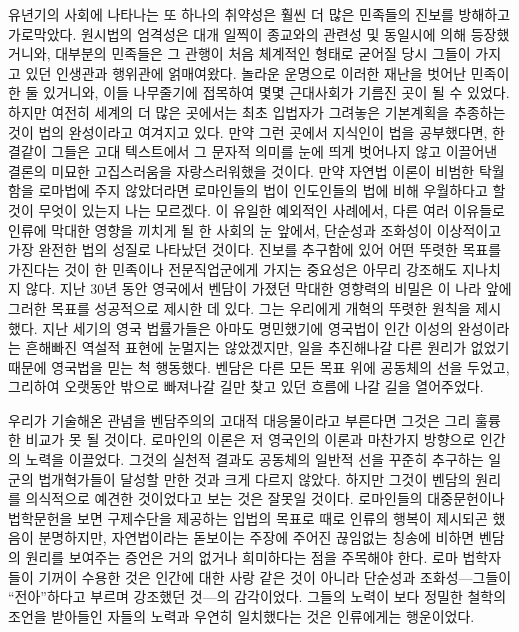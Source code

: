 유년기의 사회에 나타나는 또 하나의 취약성은 훨씬 더 많은 민족들의 진보를
방해하고 가로막았다.
원시법의 엄격성은 대개 일찍이 종교와의 관련성 및 동일시에 의해 등장했거니와,
대부분의 민족들은 그 관행이 처음 체계적인 형태로 굳어질 당시 그들이
가지고 있던 인생관과 행위관에 얽매여왔다.
놀라운 운명으로 이러한 재난을 벗어난 민족이 한 둘 있거니와,
이들 나무줄기에 접목하여 몇몇 근대사회가 기름진 곳이 될 수 있었다.
하지만 여전히 세계의 더 많은 곳에서는 최초 입법자가 그려놓은 기본계획을
추종하는 것이 법의 완성이라고 여겨지고 있다.
만약 그런 곳에서 지식인이 법을 공부했다면, 한결같이 그들은
고대 텍스트에서 그 문자적 의미를 눈에 띄게 벗어나지 않고 이끌어낸 결론의
미묘한 고집스러움을 자랑스러워했을 것이다.
만약 자연법 이론이 비범한 탁월함을 로마법에 주지 않았더라면
로마인들의 법이 인도인들의 법에 비해 우월하다고 할 것이
무엇이 있는지 나는 모르겠다.
이 유일한 예외적인 사례에서, 다른 여러 이유들로 인류에 막대한 영향을 끼치게 될
한 사회의 눈 앞에서, 단순성과 조화성이 이상적이고 가장 완전한 법의 성질로
나타났던 것이다.
진보를 추구함에 있어 어떤 뚜렷한 목표를 가진다는 것이
한 민족이나 전문직업군에게 가지는 중요성은 아무리 강조해도 지나치지 않다.
지난 30년 동안 영국에서 벤담이 가졌던 막대한 영향력의 비밀은
이 나라 앞에 그러한 목표를 성공적으로 제시한 데 있다.
그는 우리에게 개혁의 뚜렷한 원칙을 제시했다.
지난 세기의 영국 법률가들은 아마도 명민했기에
영국법이 인간 이성의 완성이라는 흔해빠진 역설적 표현에 눈멀지는 않았겠지만,
일을 추진해나갈 다른 원리가 없었기 때문에 영국법을 믿는 척 행동했다.
벤담은 다른 모든 목표 위에 공동체의 선을 두었고,
그리하여 오랫동안 밖으로 빠져나갈 길만 찾고 있던 흐름에 나갈 길을 열어주었다.

우리가 기술해온 관념을 벤담주의의 고대적 대응물이라고 부른다면
그것은 그리 훌륭한 비교가 못 될 것이다.
로마인의 이론은 저 영국인의 이론과 마찬가지 방향으로 인간의 노력을 이끌었다.
그것의 실천적 결과도 공동체의 일반적 선을 꾸준히 추구하는
일군의 법개혁가들이 달성할 만한 것과 크게 다르지 않았다.
하지만 그것이 벤담의 원리를
의식적으로 예견한 것이었다고 보는 것은 잘못일 것이다.
로마인들의 대중문헌이나 법학문헌을 보면
구제수단을 제공하는 입법의 목표로
때로 인류의 행복이 제시되곤 했음이 분명하지만,
자연법이라는 돋보이는 주장에 주어진 끊임없는 칭송에 비하면
벤담의 원리를 보여주는 증언은 거의 없거나 희미하다는 점을
주목해야 한다.
로마 법학자들이 기꺼이 수용한 것은 인간에 대한 사랑 같은 것이 아니라
단순성과 조화성---그들이 ``전아''하다고 부르며
강조했던 것---의 감각이었다.
그들의 노력이 보다 정밀한 철학의 조언을 받아들인 자들의 노력과
우연히 일치했다는 것은 인류에게는 행운이었다.

